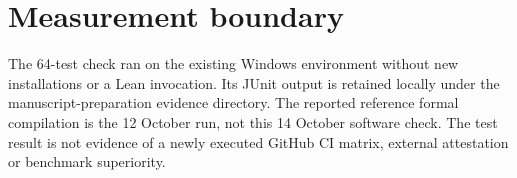\documentclass[11pt,a4paper]{article}
\begin{document}
\section{Measurement boundary}

The 64-test check ran on the existing Windows environment without new installations or a Lean invocation. Its JUnit output is retained locally under the manuscript-preparation evidence directory. The reported reference formal compilation is the 12 October run, not this 14 October software check. The test result is not evidence of a newly executed GitHub CI matrix, external attestation or benchmark superiority.
\end{document}
